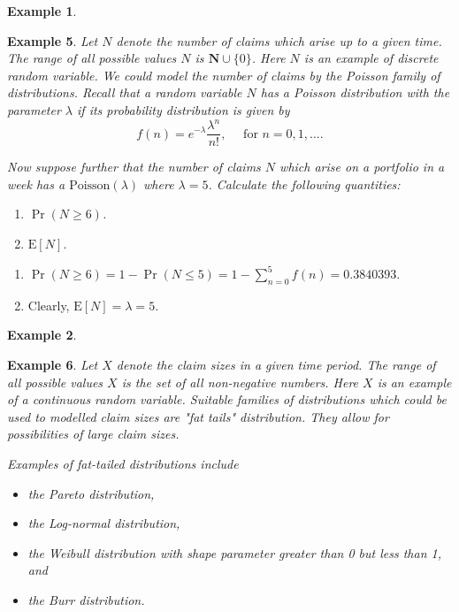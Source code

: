 \documentclass[
]{book}
\theoremstyle{definition}
\theoremstyle{definition}
\newtheorem{example}{Example}[chapter]
\theoremstyle{definition}
\theoremstyle{definition}
\theoremstyle{remark}
\begin{document}
\begin{example}
\protect\hypertarget{exm:unlabeled-div-5}{}\label{exm:unlabeled-div-5}

\textbf{Example 5}. \emph{Let \(N\) denote the number of claims which arise up to a
given time. The range of all possible values \(N\) is
\(\mathbf{N} \cup \{0\}\). Here \(N\) is an example of discrete random
variable. We could model the number of claims by the Poisson family of
distributions. Recall that a random variable \(N\) has a Poisson
distribution with the parameter \(\lambda\) if its probability
distribution is given by
\[f(n) = e^{- \lambda} \frac{\lambda^n}{n !}, \quad \text{ for } n = 0,1,\ldots.\]}

\emph{Now suppose further that the number of claims \(N\) which arise on a
portfolio in a week has a \(\text{Poisson}(\lambda)\) where \(\lambda = 5\).
Calculate the following quantities:}

\begin{enumerate}
\def\labelenumi{\arabic{enumi}.}
\item
  \emph{\(\Pr(N \ge 6)\).}
\item
  \emph{\(\mathrm{E}[N]\).}
\end{enumerate}

\end{example}

\begin{enumerate}
\def\labelenumi{\arabic{enumi}.}
\item
  \(\Pr(N \ge 6) = 1 - \Pr(N \le 5) = 1 - \sum_{n=0}^5 f(n) = 0.3840393.\)
\item
  Clearly, \(\mathrm{E}[N] = \lambda = 5\).
\end{enumerate}

\begin{example}
\protect\hypertarget{exm:unlabeled-div-6}{}\label{exm:unlabeled-div-6}

\textbf{Example 6}. \emph{Let \(X\) denote the claim sizes in a given time period.
The range of all possible values \(X\) is the set of all non-negative
numbers. Here \(X\) is an example of a continuous random variable.
Suitable families of distributions which could be used to modelled claim
sizes are "fat tails" distribution. They allow for possibilities of
large claim sizes.}

\emph{Examples of fat-tailed distributions include}

\begin{itemize}
\item
  \emph{the Pareto distribution,}
\item
  \emph{the Log-normal distribution,}
\item
  \emph{the Weibull distribution with shape parameter greater than 0 but
  less than 1, and}
\item
  \emph{the Burr distribution.}
\end{itemize}

\end{example}
\end{document}
